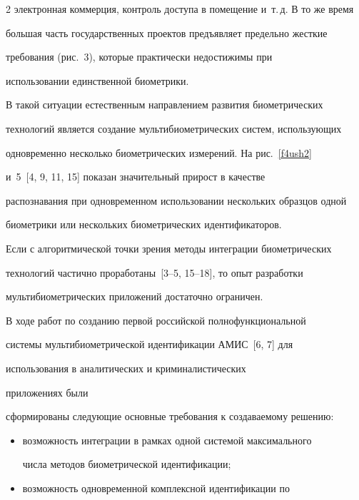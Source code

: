 \begin{multicols}{2}
электронная коммерция, контроль доступа в помещение и~т.\,д. В то же время 

большая часть государственных проектов предъявляет предельно жесткие 

требования (рис.~3), которые практически недостижимы при 

использовании единственной биометрики.



 

  В такой ситуации естественным направлением развития биометрических 

технологий является создание мультибиометрических систем, использующих 

одновременно несколько биометрических измерений. На рис.~\ref{f4ush2} 

и~5~[4, 9, 11, 15] показан значительный прирост в качестве 

распознавания при одновременном использовании нескольких образцов одной 

биометрики или нескольких биометрических идентификаторов.

  

  

  

  Если с алгоритмической точки зрения методы интеграции биометрических 

технологий частично проработаны~[3--5, 15--18], то опыт разработки 

мультибиометрических приложений достаточно ограничен. 

  

  В ходе работ по созданию первой российской полнофункциональной 

системы мультибиометрической идентификации АМИС~[6, 7] для 

исполь\-зо\-ва\-ния в аналитических и криминалистических %

прило\-же\-ни\-ях были 

сформированы сле\-ду\-ющие основные требования к создаваемому решению:

  \begin{itemize}

\item возможность интеграции в рамках одной сис\-те\-мой максимального 

числа методов био\-мет\-ри\-че\-ской идентификации;

\item возможность одновременной комплексной идентификации по 


\end{itemize}
\end{multicols}
